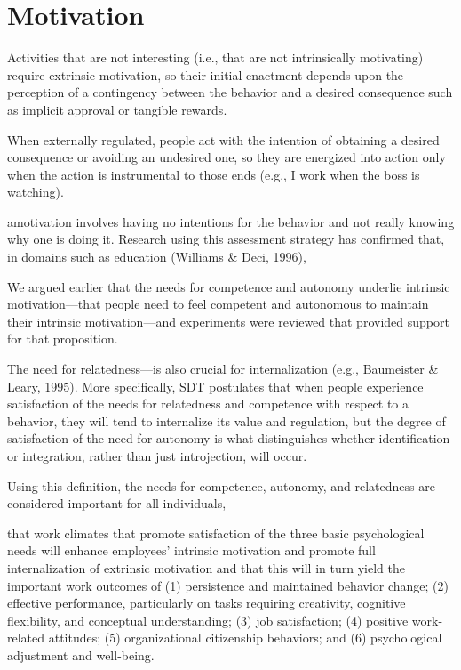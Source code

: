 \section{Motivation}
Activities that are not interesting (i.e., that are not intrinsically motivating) require extrinsic motivation, so their initial enactment depends upon the perception of a contingency between the behavior and a desired consequence such as implicit approval or tangible rewards.

When externally regulated, people act with the intention of obtaining a desired consequence or avoiding an undesired one, so they are energized into action only when the action is instrumental to those ends (e.g., I work when the boss is watching).

amotivation involves having no intentions for the behavior and not really knowing why one is doing it. Research using this assessment strategy has conﬁrmed that, in domains such as education (Williams \& Deci, 1996),

We argued earlier that the needs for competence and autonomy underlie intrinsic motivation—that people need to feel competent and autonomous to maintain their intrinsic motivation—and experiments were reviewed that provided support for that proposition.

The need for relatedness—is also crucial for internalization (e.g., Baumeister \& Leary, 1995). More speciﬁcally, SDT postulates that when people experience satisfaction of the needs for relatedness and competence with respect to a behavior, they will tend to internalize its value and regulation, but the degree of satisfaction of the need for autonomy is what distinguishes whether identiﬁcation or integration, rather than just introjection, will occur.

Using this deﬁnition, the needs for competence, autonomy, and relatedness are considered important for all individuals,

that work climates that promote satisfaction of the three basic psychological needs will enhance employees’ intrinsic motivation and promote full internalization of extrinsic motivation and that this will in turn yield the important work outcomes of (1) persistence and maintained behavior change; (2) effective performance, particularly on tasks requiring creativity, cognitive ﬂexibility, and conceptual understanding; (3) job satisfaction; (4) positive work-related attitudes; (5) organizational citizenship behaviors; and (6) psychological adjustment and well-being.


